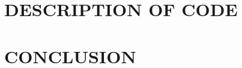 \documentclass[10pt,twocolumn]{witseiepaper}
\begin{document}
\section{DESCRIPTION OF CODE}

% 


\section{CONCLUSION}



\begin{thebibliography}{1}

\end{thebibliography}




\clearpage
\onecolumn
\appendix
\end{document}

